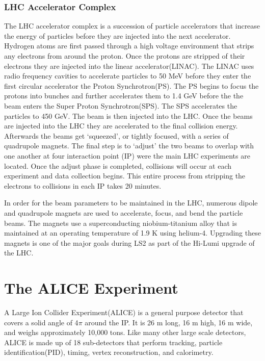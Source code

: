\subsubsection{LHC Accelerator Complex}\label{sec:LHCop}
The LHC accelerator complex is a succession of particle accelerators that increase the energy of particles before they are injected into the next accelerator.  Hydrogen atoms are first passed through a high voltage environment that strips any electrons from around the proton.  Once the protons are stripped of their electrons they are injected into the linear accelerator(LINAC).  The LINAC uses radio frequency cavities to accelerate particles to 50 MeV before they enter the first circular accelerator the Proton Synchrotron(PS).  The PS begins to focus the protons into bunches and further accelerates them to 1.4 GeV before the the beam enters the Super Proton Synchrotron(SPS).  The SPS accelerates the particles to 450 GeV.  The beam is then injected into the LHC.  Once the beams are injected into the LHC they are accelerated to the final collision energy.  Afterwards the beams get `squeezed', or tightly focused, with a series of quadrupole magnets.  The final step is to `adjust'  the two beams to overlap with one another at four interaction point (IP) were the main LHC experiments are located.  Once the adjust phase is completed, collisions will occur at each experiment and data  collection begins.  This entire process from stripping the electrons to collisions in each IP takes 20 minutes.

In order for the beam parameters to be maintained in the LHC, numerous dipole and quadrupole magnets are used to accelerate, focus, and bend the particle beams.  The magnets use a superconducting niobium-titanium alloy that is maintained at an operating temperature of 1.9 K using helium-4.  Upgrading these magnets is one of the major goals during LS2 as part of the Hi-Lumi upgrade of the LHC\cite{Fabjan:2011jb}.


\section{The ALICE Experiment}
A Large Ion Collider Experiment(ALICE) is a general purpose detector that covers a solid angle of 4$ \pi$ around the IP.  It is 26 m long, 16 m high, 16 m wide, and weighs approximately 10,000 tons\cite{Fabjan:2011jb}.  Like many other large scale detectors, ALICE is made up of 18 sub-detectors that perform tracking, particle identification(PID), timing, vertex reconstruction, and calorimetry.  

